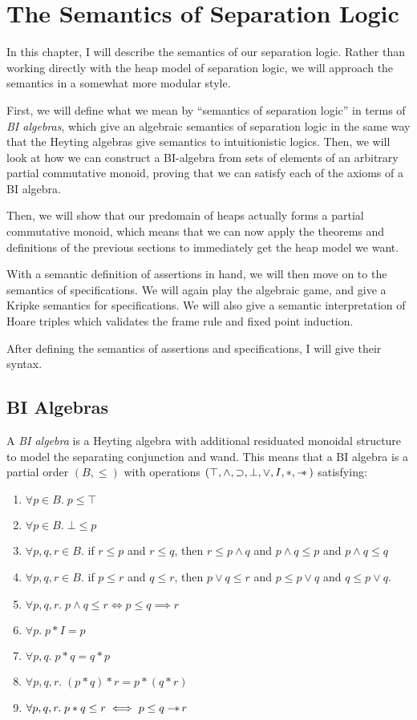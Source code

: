 \chapter{The Semantics of Separation Logic}

In this chapter, I will describe the semantics of our separation
logic. Rather than working directly with the heap model of separation
logic, we will approach the semantics in a somewhat more modular
style.

First, we will define what we mean by ``semantics of separation logic''
in terms of \emph{BI algebras}, which give an algebraic semantics of
separation logic in the same way that the Heyting algebras give
semantics to intuitionistic logics. Then, we will look at how we can
construct a BI-algebra from sets of elements of an arbitrary partial
commutative monoid, proving that we can satisfy each of the axioms of
a BI algebra.

Then, we will show that our predomain of heaps actually forms a
partial commutative monoid, which means that we can now apply the
theorems and definitions of the previous sections to immediately get
the heap model we want.

With a semantic definition of assertions in hand, we will then move on
to the semantics of specifications. We will again play the algebraic
game, and give a Kripke semantics for specifications. We will also
give a semantic interpretation of Hoare triples which validates the
frame rule and fixed point induction.

After defining the semantics of assertions and specifications, I will
give their syntax.

\section{BI Algebras}

A \emph{BI algebra} is a Heyting algebra with additional residuated
monoidal structure to model the separating conjunction and wand. This
means that a BI algebra is a partial order $(B, \leq)$ with operations
$(\top, \land, \supset, \bot, \vee, I, *, -\!\!*\,)$ satisfying:

\begin{enumerate}
\item $\forall p \in B.\; p \leq \top$
\item $\forall p \in B.\; \bot \leq p$
\item $\forall p,q,r \in B.$ if $r \leq p$ and $r \leq q$, then
      $r \leq p \land q$ and 
      $p \land q \leq p$ and $p \land q \leq q$
\item $\forall p,q,r \in B.$ if $p \leq r$ and $q \leq r$, then
      $p \vee q \leq r$ and
      $p \leq p \vee q$ and $q \leq p \vee q$.
\item $\forall p, q, r.\; p \land q \leq r \iff p \leq q \implies r$
\item $\forall p.\; p * I = p$
\item $\forall p, q.\; p * q = q * p$
\item $\forall p, q, r.\; (p * q) * r = p * (q * r)$
\item $\forall p, q, r.\; p * q \leq r \iff p \leq q -\!\!*\, r$
\end{enumerate}

